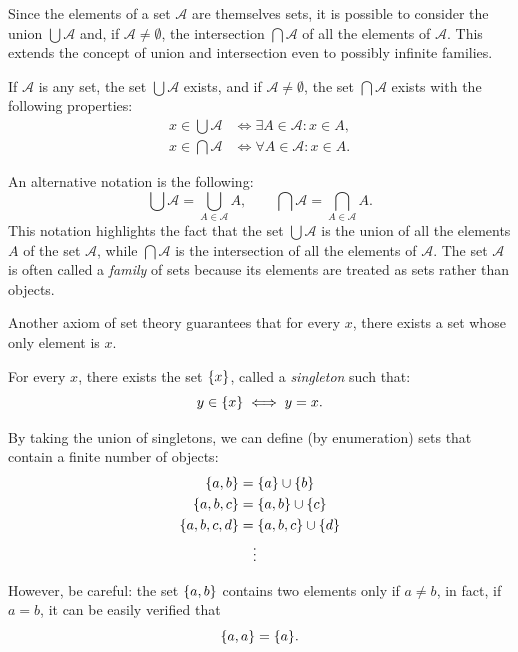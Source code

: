 Since the elements of a set $\mathcal A$ are themselves sets, it is possible to
consider the union $\bigcup \mathcal A$ and, if 
$\mathcal A \neq \emptyset$, the intersection $\bigcap \mathcal A$ of all the
elements of $\mathcal A$. This extends the concept of union and intersection
even to possibly infinite families.

\begin{axiom}
If $\mathcal A$ is any set, the set $\bigcup \mathcal A$ exists, and if
$\mathcal A \neq \emptyset$, the set $\bigcap \mathcal A$ exists with the
following properties:
\begin{align*}
  x \in \bigcup \mathcal A & \iff \exists A \in \mathcal A \colon x\in A, \\
  x \in \bigcap \mathcal A & \iff \forall A \in \mathcal A \colon x\in A.
\end{align*}
\end{axiom}
An alternative notation is the following:
\[
 \bigcup \mathcal A = \bigcup_{A\in \mathcal A} A, \qquad 
 \bigcap \mathcal A = \bigcap_{A\in \mathcal A} A.  
\]
This notation highlights the fact that the set $\bigcup \mathcal A$ is the union
of all the elements $A$ of the set $\mathcal A$, while $\bigcap \mathcal A$ is
the intersection of all the elements of $\mathcal A$. The set $\mathcal A$ is
often called a \emph{family} of sets because its elements are treated as sets
rather than objects.

Another axiom of set theory guarantees that for every $x$, there exists a set
whose only element is $x$.
\begin{axiom}[singleton]
  For every $x$, there exists the set ${\left\{ x \right\}}$, called a \emph{singleton}%
%
  such that:
  \[
    y \in {\left\{ x \right\}} \iff y=x.
  \]
\end{axiom}
By taking the union of singletons, we can define (by enumeration) sets that
contain a finite number of objects:
\begin{align*}
  {\left\{ a,b \right\}} &= {\left\{ a \right\}} \cup {\left\{ b \right\}} \\
  {\left\{ a, b, c \right\}} &= {\left\{ a,b \right\}} \cup {\left\{ c \right\}}\\
  {\left\{ a, b, c, d \right\}} &= {\left\{ a,b,c \right\}} \cup {\left\{ d \right\}}\\
  &\quad\vdots
\end{align*}

However, be careful: the set ${\left\{ a,b \right\}}$ contains two elements only if
$a\neq b$, in fact, if $a=b$, it can be easily verified that
\begin{equation}\label{eq:4775523}
{\left\{ a,a \right\}} = {\left\{ a \right\}}.
\end{equation}

